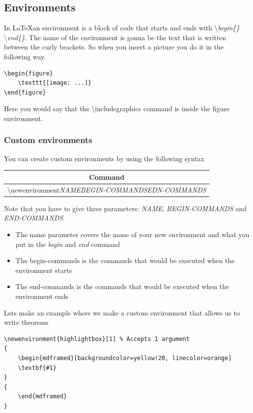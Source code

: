 \documentclass{article}
\newcommand{\jbs}[1]{\textbackslash{}#1} %
\begin{document}
\subsection{Environments}
In \LaTeX an environment is a block of code that starts and ends with \jbs{\textit{begin\{\}}} \jbs{\textit{end\{\}}}. The name of the environment is gonna be the text that is written between the curly brackets. So when you insert a picture you do it in the following way.

\begin{verbatim}
\begin{figure}
    \texttt{[image: ...]}
\end{figure}
\end{verbatim}

Here you would say that the \jbs{includegraphics} command is inside the figure environment.

\subsubsection{Custom environments}
You can create custom environments by using the following syntax
\begin{table}[H]
    \centering
    \begin{tabular}{|c|} \hline
        \rowcolor{gray!30}
        Command \\ \hline
        \jbs{newenvironment}{\textit{NAME}}{\textit{BEGIN-COMMANDS}}{\textit{EDN-COMMANDS}} \\ \hline
    \end{tabular}
\end{table} %

Note that you have to give three parameters: \textit{NAME}, \textit{BEGIN-COMMANDS} and \textit{END-COMMANDS}.
\begin{itemize}
    \item The name parameter covers the name of your new environment and what you put in the \textit{begin} and \textit{end} command
    \item The begin-commands is the commands that would be executed when the environment starts
    \item The end-commands is the commands that would be executed when the environment ends
\end{itemize}

Lets make an example where we make a custom environment that allows us to write theorems
\begin{verbatim}
\newenvironment{highlightbox}[1] % Accepts 1 argument
{
    \begin{mdframed}[backgroundcolor=yellow!20, linecolor=orange]
    \textbf{#1}
}
{
    \end{mdframed}
}
\end{verbatim}
\end{document}
